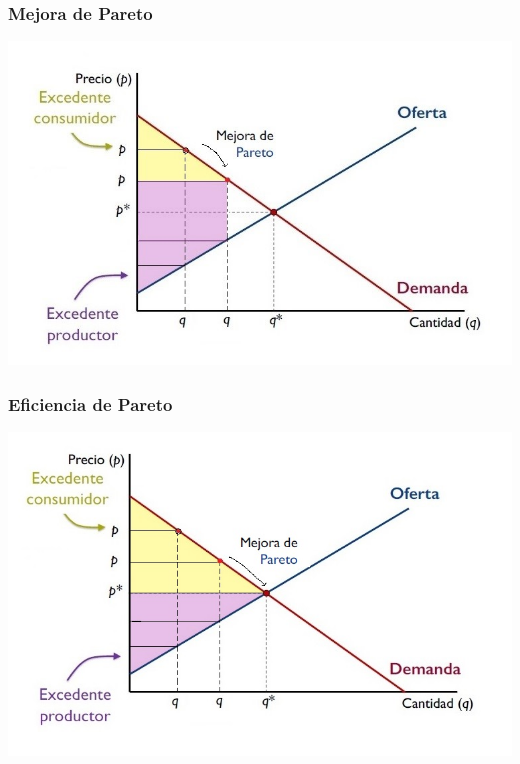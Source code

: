 \documentclass{beamer}
\begin{document}
\begin{frame}
\frametitle{Mejora de Pareto}
\includegraphics[scale=0.6]{Slides Principios de Economia/Figures/Tema_07.23_newexcedentes2.jpg}
\end{frame}

\begin{frame}
\frametitle{Eficiencia de Pareto}
\includegraphics[scale=0.6]{Slides Principios de Economia/Figures/Tema_07.23_newexcedentes3.jpg}
\end{frame}
\end{document}
